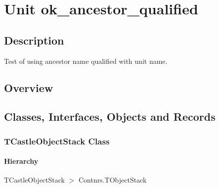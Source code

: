 \documentclass{report}
\newif\ifpdf
\begin{document}
\label{toc}\tableofcontents
\newpage
\newlength{\tmplength}
\chapter{Unit ok{\_}ancestor{\_}qualified}
\label{ok_ancestor_qualified}
\section{Description}
Test of using ancestor name qualified with unit name.
\section{Overview}
\begin{description}
\item[\texttt{\begin{ttfamily}TCastleObjectStack\end{ttfamily} Class}]
\item[\texttt{\begin{ttfamily}TSomethingElse\end{ttfamily} Class}]
\end{description}
\section{Classes, Interfaces, Objects and Records}
\ifpdf
\subsection*{\large{\textbf{TCastleObjectStack Class}}\normalsize\hspace{1ex}\hrulefill}
\else
\subsection*{TCastleObjectStack Class}
\fi
\label{ok_ancestor_qualified.TCastleObjectStack}
\subsubsection*{\large{\textbf{Hierarchy}}\normalsize\hspace{1ex}\hfill}
TCastleObjectStack {$>$} Contnrs.TObjectStack
\end{document}
